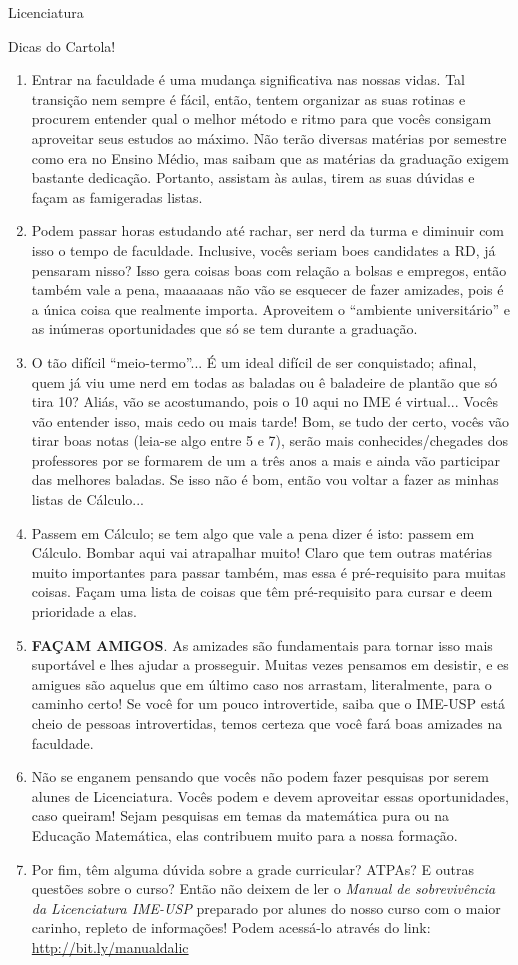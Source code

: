 \begin{subsecao}{Licenciatura}
\begin{subsubsecao}{Dicas do Cartola!}
\begin{enumerate}
\item Entrar na faculdade é uma mudança significativa nas nossas vidas. Tal transição
nem sempre é fácil, então, tentem organizar as suas rotinas e procurem entender qual
o melhor método e ritmo para que vocês consigam aproveitar seus estudos ao máximo. Não
terão diversas matérias por semestre como era no Ensino Médio, mas saibam que as matérias
da graduação exigem bastante dedicação. Portanto, assistam às aulas, tirem as suas dúvidas
e façam as famigeradas listas.
\item Podem passar horas estudando até rachar, ser nerd da turma e diminuir com
 isso o tempo de faculdade. Inclusive, vocês seriam boes candidates a RD, já pensaram nisso? 
Isso gera coisas boas com relação a bolsas e empregos, então também vale a pena, 
maaaaaas não vão se esquecer de fazer amizades, pois é a única coisa que realmente importa.
Aproveitem o ``ambiente universitário'' e as inúmeras oportunidades que só se tem durante
a graduação.
\item O tão difícil ``meio-termo''... É um ideal difícil de ser conquistado; afinal,
  quem já viu ume nerd em todas as baladas ou ê baladeire de plantão que só tira
  10? Aliás, vão se acostumando, pois o 10 aqui no IME é virtual... Vocês vão
  entender isso, mais cedo ou mais tarde! Bom, se tudo der certo, vocês vão
  tirar boas notas (leia-se algo entre 5 e 7), serão mais conhecides/chegades
  dos professores por se formarem de um a três anos a mais e ainda
  vão participar das melhores baladas.
  Se isso não é bom, então vou voltar a fazer as minhas listas de Cálculo...
\item Passem em Cálculo; se tem algo que vale a pena dizer é isto: passem em
  Cálculo. Bombar aqui vai atrapalhar muito! Claro que tem outras matérias muito
  importantes para passar também, mas essa é pré-requisito para muitas coisas.
  Façam uma lista de coisas que têm pré-requisito para cursar e deem prioridade
  a elas. 
  \item \textbf{FAÇAM AMIGOS}. As amizades são fundamentais para tornar isso
mais suportável e lhes ajudar a prosseguir. Muitas vezes pensamos em desistir,
 e es amigues são aquelus que em último caso nos arrastam, literalmente, para o caminho certo!
 Se você for um pouco introvertide, saiba que o IME-USP está cheio de pessoas introvertidas, 
 temos certeza que você fará boas amizades na faculdade.
 \item Não se enganem pensando que vocês não podem fazer pesquisas por serem alunes de
 Licenciatura. Vocês podem e devem aproveitar essas oportunidades, caso queiram! Sejam pesquisas
 em temas da matemática pura ou na Educação Matemática, elas contribuem muito para a nossa formação.
 \item Por fim, têm alguma dúvida sobre a grade curricular? ATPAs? E outras questões sobre o curso?
Então não deixem de ler o \textit{Manual de sobrevivência da Licenciatura IME-USP} preparado por alunes
do nosso curso com o maior carinho, repleto de informações! Podem acessá-lo através
do link: \url{http://bit.ly/manualdalic}


\end{enumerate}
\end{subsubsecao}
\end{subsecao}
